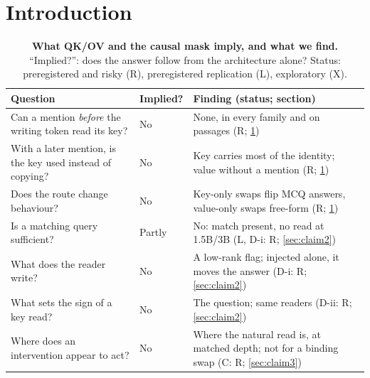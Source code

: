 \documentclass{article}
\begin{document}
\section{Introduction}\label{sec:claim1}\label{sec:claim2}\label{sec:claim3}
\begin{table}[t]
  \centering
  \caption{\textbf{What QK/OV and the causal mask imply, and what we find.} ``Implied?'': does the answer follow from the architecture alone? Status: preregistered and risky (R), preregistered replication (L), exploratory (X).}
  \label{tab:qkov}
  \footnotesize\setlength{\tabcolsep}{3pt}
  \begin{tabular}{@{}p{}p{}p{}@{}}
    \toprule
    Question & Implied? & Finding (status; section) \\
    \midrule
    Can a mention \emph{before} the writing token read its key? & No & None, in every family and on passages (R; \cref{sec:claim1}) \\
    With a later mention, is the key used instead of copying? & No & Key carries most of the identity; value without a mention (R; \cref{sec:claim1}) \\
    Does the route change behaviour? & No & Key-only swaps flip MCQ answers, value-only swaps free-form (R; \cref{sec:claim1}) \\
    Is a matching query sufficient? & Partly & No: match present, no read at 1.5B/3B (L, D-i: R; \cref{sec:claim2}) \\
    What does the reader write? & No & A low-rank flag; injected alone, it moves the answer (D-i: R; \cref{sec:claim2}) \\
    What sets the sign of a key read? & No & The question; same readers (D-ii: R; \cref{sec:claim2}) \\
    Where does an intervention appear to act? & No & Where the natural read is, at matched depth; not for a binding swap (C: R; \cref{sec:claim3}) \\
    \bottomrule
  \end{tabular}
\end{table}
\end{document}
